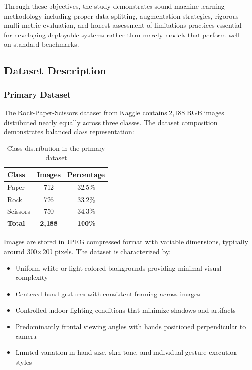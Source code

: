 \documentclass[12pt,a4paper]{article}
\begin{document}
Through these objectives, the study demonstrates sound machine learning methodology including proper data splitting, augmentation strategies, rigorous multi-metric evaluation, and honest assessment of limitations-practices essential for developing deployable systems rather than merely models that perform well on standard benchmarks.

\subsection{Dataset Description}

\subsubsection{Primary Dataset}

The Rock-Paper-Scissors dataset from Kaggle contains 2,188 RGB images distributed nearly equally across three classes. The dataset composition demonstrates balanced class representation:

\begin{table}[H]
\centering
\begin{tabular}{lcc}
\toprule
\textbf{Class} & \textbf{Images} & \textbf{Percentage} \\
\midrule
Paper & 712 & 32.5\% \\
Rock & 726 & 33.2\% \\
Scissors & 750 & 34.3\% \\
\midrule
\textbf{Total} & \textbf{2,188} & \textbf{100\%} \\
\bottomrule
\end{tabular}
\caption{Class distribution in the primary dataset}
\end{table}

Images are stored in JPEG compressed format with variable dimensions, typically around 300×200 pixels. The dataset is characterized by:

\begin{itemize}
    \item Uniform white or light-colored backgrounds providing minimal visual complexity
    \item Centered hand gestures with consistent framing across images
    \item Controlled indoor lighting conditions that minimize shadows and artifacts
    \item Predominantly frontal viewing angles with hands positioned perpendicular to camera
    \item Limited variation in hand size, skin tone, and individual gesture execution styles
\end{itemize}
\end{document}
